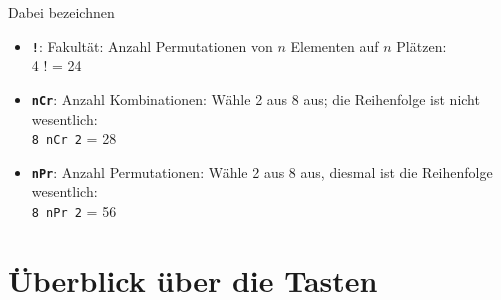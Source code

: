 Dabei bezeichnen

\begin{itemize}
\item \texttt{\textbf{!}}: Fakultät: Anzahl Permutationen von $n$ Elementen auf $n$ Plätzen:\\
4 ! = 24

\item \texttt{\textbf{nCr}}: Anzahl Kombinationen: Wähle 2 aus 8 aus; die Reihenfolge ist nicht wesentlich:\\
\texttt{8 nCr 2} = 28

\item \texttt{\textbf{nPr}}: Anzahl Permutationen: Wähle 2 aus 8 aus, diesmal ist die Reihenfolge wesentlich:\\
\texttt{8 nPr 2} = 56
\end{itemize}


\newpage


\section*{Überblick über die Tasten}

